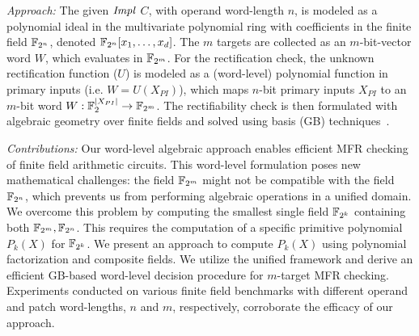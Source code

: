 {\it Approach:}
The given ${\it Impl}$ $C$, with operand word-length $n$, is modeled
as a polynomial ideal in the multivariate polynomial ring with
coefficients in the finite field ${\mathbb{F}}_{2^n}$, denoted ${\mathbb{F}}_{2^n}[x_1,\dots,x_d]$. 
The $m$ targets are
collected as an $m$-bit-vector word $W$, which evaluates in ${\mathbb{F}}_{2^m}$.
For the 
rectification check, the %
unknown rectification function ($U$) is  modeled as a (word-level)
polynomial function in primary inputs (i.e. $W = U(X_{PI})$), which maps 
$n$-bit primary inputs $X_{PI}$ to an $m$-bit word $W :{\mathbb{F}}_2^{|X_{PI}|} \rightarrow {\mathbb{F}}_{2^m}$.
The rectifiability check 
is then formulated with algebraic geometry over finite fields 
and solved using \Grobner basis (GB) techniques~\cite{gb_book}.


{\it Contributions:}
Our word-level algebraic approach enables efficient MFR checking 
of finite field arithmetic circuits.
This word-level formulation poses new mathematical challenges: 
the field ${\mathbb{F}}_{2^m}$ might not be compatible with the field
${\mathbb{F}}_{2^n}$, which prevents us from performing algebraic operations in a unified domain.
We overcome this problem by computing the smallest single field ${\mathbb{F}}_{2^k}$
containing both ${\mathbb{F}}_{2^m}, {\mathbb{F}}_{2^n}$. This requires the computation of  
a specific primitive polynomial $P_k(X)$ for ${\mathbb{F}}_{2^k}$. 
We present an approach to compute
$P_k(X)$ using polynomial factorization and composite
fields. We utilize the unified framework and derive an efficient
GB-based word-level decision procedure for $m$-target MFR checking.  
Experiments conducted on various finite field
benchmarks with different operand and patch word-lengths, $n$ and $m$,
respectively, corroborate the efficacy of our approach.

